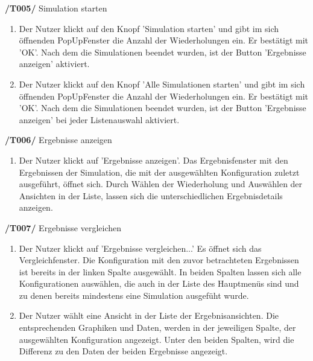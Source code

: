 \textbf{/T005/} Simulation starten
\begin{enumerate}
\item {}
{Der Nutzer klickt auf den Knopf 'Simulation starten' und gibt im sich öffnenden PopUpFenster die Anzahl der Wiederholungen ein. Er bestätigt mit 'OK'.}
{Nach dem die Simulationen beendet wurden, ist der Button 'Ergebnisse anzeigen' aktiviert.}

\item {}
{Der Nutzer klickt auf den Knopf 'Alle Simulationen starten' und gibt im sich öffnenden PopUpFenster die Anzahl der Wiederholungen ein. Er bestätigt mit 'OK'.}
{Nach dem die Simulationen beendet wurden, ist der Button 'Ergebnisse anzeigen' bei jeder Listenauswahl aktiviert.}


\end{enumerate}

\textbf{/T006/} Ergebnisse anzeigen
\begin{enumerate}
\item {}
{Der Nutzer klickt auf 'Ergebnisse anzeigen'.}
{Das Ergebnisfenster mit den Ergebnissen der Simulation, die mit der ausgewählten Konfiguration zuletzt ausgeführt, öffnet sich. Durch Wählen der Wiederholung und Auswählen der Ansichten in der Liste, lassen sich die unterschiedlichen Ergebnisdetails anzeigen.}


\end{enumerate}

\textbf{/T007/} Ergebnisse vergleichen
\begin{enumerate}
\item {}
{Der Nutzer klickt auf 'Ergebnisse vergleichen...'}
{Es öffnet sich das Vergleichfenster. Die Konfiguration mit den zuvor betrachteten Ergebnissen ist bereits in der linken Spalte ausgewählt. In beiden Spalten lassen sich alle Konfigurationen auswählen, die auch in der Liste des Hauptmenüs sind und zu denen bereits mindestens eine Simulation ausgefüht wurde.}

\item {}
{Der Nutzer wählt eine Ansicht in der Liste der Ergebnisansichten.}
{Die entsprechenden Graphiken und Daten, werden in der jeweiligen Spalte, der ausgewählten Konfiguration angezeigt. Unter den beiden Spalten, wird die Differenz zu den Daten der beiden Ergebnisse angezeigt.}


\end{enumerate}

